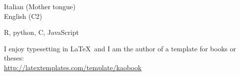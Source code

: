 \documentclass[10pt]{article} %
\begin{document}
{
Italian (Mother tongue) \\
English (C2)
}

{
R, python, C, JavaScript
}

\skillgroup{\LaTeX}
{
I enjoy typesetting in \LaTeX\ and I am the author of a template for books or theses:\\
\href{http://latextemplates.com/template/kaobook/}{http://latextemplates.com/template/kaobook}
}








\nocite{*}
\printbibliography[title=Publications]
\end{document}
